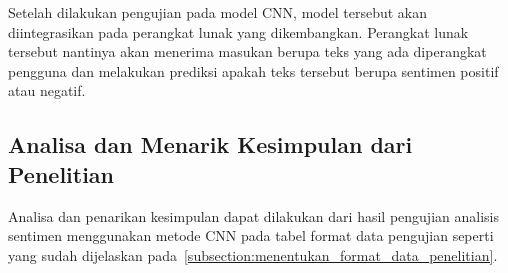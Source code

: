 Setelah dilakukan pengujian pada model CNN, model tersebut akan diintegrasikan pada perangkat lunak
yang dikembangkan. Perangkat lunak tersebut nantinya akan menerima masukan berupa teks yang ada diperangkat
pengguna dan melakukan prediksi apakah teks tersebut berupa sentimen positif atau negatif.

\subsection{Analisa dan Menarik Kesimpulan dari Penelitian}
Analisa dan penarikan kesimpulan dapat dilakukan dari hasil pengujian analisis sentimen menggunakan metode
CNN pada tabel format data pengujian seperti yang sudah dijelaskan pada~\autoref{subsection:menentukan_format_data_penelitian}.